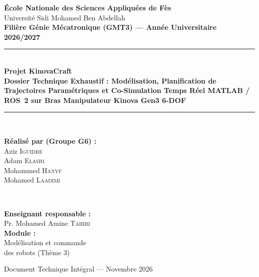 \documentclass[11pt,a4paper]{report}
\begin{document}
\begin{titlepage}
    \centering
    \vspace*{0.3cm}
    
    {\Large \textbf{École Nationale des Sciences Appliquées de Fès}}\\[0.2cm]
    {\large Université Sidi Mohamed Ben Abdellah}\\[0.3cm]
    {\large \textbf{Filière Génie Mécatronique (GMT3) — Année Universitaire 2026/2027}}\\[1.0cm]
    
    \rule{\linewidth}{0.6mm} \\[0.4cm]
    {\huge \bfseries Projet KinovaCraft} \\[0.3cm]
    {\Large \bfseries Dossier Technique Exhaustif : Modélisation, Planification de Trajectoires Paramétriques et Co-Simulation Temps Réel MATLAB / ROS~2 sur Bras Manipulateur Kinova Gen3 6-DOF} \\[0.4cm]
    \rule{\linewidth}{0.6mm} \\[1.0cm]
    
    \begin{minipage}{0.52\textwidth}
        \begin{flushleft} \large
            \textbf{Réalisé par (Groupe G6) :} \\
            Aziz \textsc{Iguidre} \\
            Adam \textsc{Elasri} \\
            Mohammed \textsc{Hanyf} \\
            Mohamed \textsc{Laadimi}
        \end{flushleft}
    \end{minipage}
    ~
    \begin{minipage}{0.43\textwidth}
        \begin{flushright} \large
            \textbf{Enseignant responsable :} \\
            Pr. Mohamed Amine \textsc{Tahiri} \\[0.3cm]
            \textbf{Module :} \\
            Modélisation et commande\\
            des robots (Thème 3)
        \end{flushright}
    \end{minipage}

    \vfill
    {\large Document Technique Intégral — Novembre 2026}
\end{titlepage}
\end{document}
